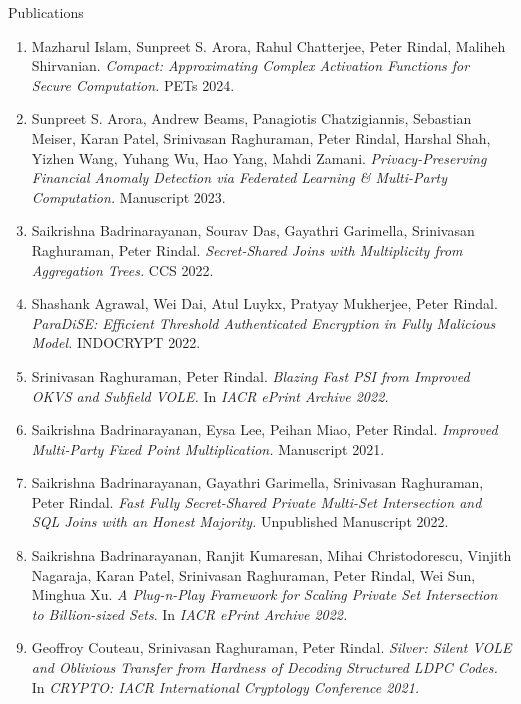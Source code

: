 \documentclass{resume} %
\begin{document}
\begin{rSection}{Publications}
\begin{enumerate}[label=C\arabic* --]
	\item Mazharul Islam, Sunpreet S. Arora, Rahul Chatterjee, Peter Rindal, Maliheh Shirvanian. \emph{Compact: Approximating Complex Activation Functions for Secure Computation.} PETs 2024.
	
	\item Sunpreet S. Arora, Andrew Beams, Panagiotis Chatzigiannis, Sebastian Meiser, Karan Patel, Srinivasan Raghuraman, Peter Rindal, Harshal Shah, Yizhen Wang, Yuhang Wu, Hao Yang, Mahdi Zamani. \emph{
	Privacy-Preserving Financial Anomaly Detection via Federated Learning \& Multi-Party Computation.} Manuscript 2023.
	
	\item Saikrishna Badrinarayanan, Sourav Das, Gayathri Garimella, Srinivasan Raghuraman, Peter Rindal. \emph{Secret-Shared Joins with Multiplicity from Aggregation Trees.} CCS 2022.
	
	
	
	\item  Shashank Agrawal, Wei Dai, Atul Luykx, Pratyay Mukherjee, Peter Rindal. \emph{ParaDiSE: Efficient Threshold Authenticated Encryption in Fully Malicious Model.} INDOCRYPT 2022.
	
	
	\item Srinivasan Raghuraman, Peter Rindal. \emph{Blazing Fast PSI from Improved OKVS and Subfield VOLE.} In \emph{IACR ePrint Archive 2022.}
	
	\item Saikrishna Badrinarayanan, Eysa Lee, Peihan Miao, Peter Rindal. \emph{Improved Multi-Party Fixed Point Multiplication.} Manuscript 2021.
	
	\item Saikrishna Badrinarayanan, Gayathri Garimella, Srinivasan Raghuraman, Peter Rindal. \emph{Fast Fully Secret-Shared Private Multi-Set Intersection and SQL Joins with an Honest Majority.} Unpublished Manuscript 2022.
	
	\item 	Saikrishna Badrinarayanan, Ranjit Kumaresan, Mihai Christodorescu, Vinjith Nagaraja, Karan Patel, Srinivasan Raghuraman, Peter Rindal, Wei Sun, Minghua Xu. \emph{A Plug-n-Play Framework for Scaling Private Set Intersection to Billion-sized Sets}.  In \emph{IACR ePrint Archive 2022.}

	
	\item Geoffroy Couteau, Srinivasan Raghuraman, Peter Rindal. \emph{ Silver: Silent VOLE and Oblivious Transfer from Hardness of Decoding Structured LDPC Codes.} In \emph{CRYPTO: IACR International Cryptology Conference 2021.}
	

\end{enumerate}
\end{rSection}
\end{document}
